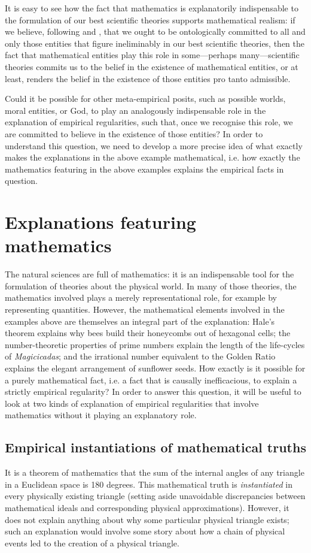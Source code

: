 \documentclass[a4paper,12pt]{article}
\begin{document}
It is easy to see how the fact that mathematics is explanatorily indispensable to the formulation of our best scientific theories supports mathematical realism: if we believe, following \cite{Quine1981} and \cite{Putnam1979}, that we ought to be ontologically committed to all and only those entities that figure ineliminably in our best scientific theories, then the fact that mathematical entities play this role in some---perhaps many---scientific theories commits us to the belief in the existence of mathematical entities, or at least, renders the belief in the existence of those entities pro tanto admissible.

Could it be possible for other meta-empirical posits, such as possible worlds, moral entities, or God, to play an analogously indispensable role in the explanation of empirical regularities, such that, once we recognise this role, we are committed to believe in the existence of those entities? In order to understand this question, we need to develop a more precise idea of what exactly makes the explanations in the above example mathematical, i.e. how exactly the mathematics featuring in the above examples explains the empirical facts in question.


\section{Explanations featuring mathematics}

The natural sciences are full of mathematics: it is an indispensable tool for the formulation of theories about the physical world. In many of those theories, the mathematics involved plays a merely representational role, for example by representing quantities. However, the mathematical elements involved in the examples above are themselves an integral part of the explanation: Hale's theorem explains why bees build their honeycombs out of hexagonal cells; the number-theoretic properties of prime numbers explain the length of the life-cycles of \textit{Magicicadas}; and the irrational number equivalent to the Golden Ratio explains the elegant arrangement of sunflower seeds. How exactly is it possible for a purely mathematical fact, i.e. a fact that is causally inefficacious, to explain a strictly empirical regularity? In order to answer this question, it will be useful to look at two kinds of explanation of empirical regularities that involve mathematics without it playing an explanatory role. 

\subsection{Empirical instantiations of mathematical truths}
It is a theorem of mathematics that the sum of the internal angles of any triangle in a Euclidean space is 180 degrees. This mathematical truth is \textit{instantiated} in every physically existing triangle (setting aside unavoidable discrepancies between mathematical ideals and corresponding physical approximations). However, it does not explain anything about why some particular physical triangle exists; such an explanation would involve some story about how a chain of physical events led to the creation of a physical triangle.
\end{document}
